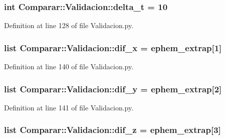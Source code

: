 \subsubsection[{delta\-\_\-t}]{\setlength{\rightskip}{0pt plus 5cm}int {\bf \-Comparar\-::\-Validacion\-::delta\-\_\-t} = 10}\label{namespace_comparar_1_1_validacion_acd4618f9a819d0cbbd6ff1ffe502bbf2}


\-Definition at line 128 of file \-Validacion.\-py.

\subsubsection[{dif\-\_\-x}]{\setlength{\rightskip}{0pt plus 5cm}list {\bf \-Comparar\-::\-Validacion\-::dif\-\_\-x} = ephem\-\_\-extrap[1]}\label{namespace_comparar_1_1_validacion_a87897110cb8a4b8db1a08ed8c5318a01}


\-Definition at line 140 of file \-Validacion.\-py.

\subsubsection[{dif\-\_\-y}]{\setlength{\rightskip}{0pt plus 5cm}list {\bf \-Comparar\-::\-Validacion\-::dif\-\_\-y} = ephem\-\_\-extrap[2]}\label{namespace_comparar_1_1_validacion_a33567b3934faabee8f2d98ba8dc472a4}


\-Definition at line 141 of file \-Validacion.\-py.

\subsubsection[{dif\-\_\-z}]{\setlength{\rightskip}{0pt plus 5cm}list {\bf \-Comparar\-::\-Validacion\-::dif\-\_\-z} = ephem\-\_\-extrap[3]}\label{namespace_comparar_1_1_validacion_ac024f04da27ccd64a8e7f43f5ffcf735}


